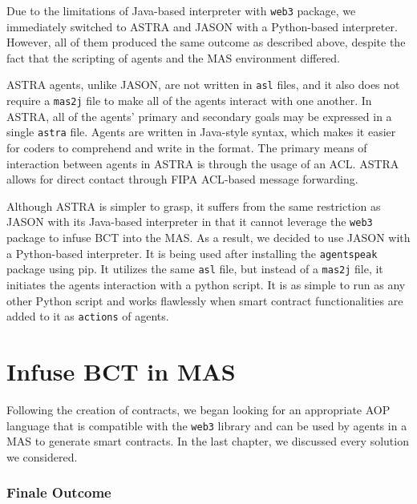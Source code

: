 \vspace{.5cm}

Due to the limitations of Java-based interpreter with \texttt{web3} package, we immediately switched to \ac{ASTRA} and JASON with a Python-based interpreter. However, all of them produced the same outcome as described above, despite the fact that the scripting of agents and the \ac{MAS} environment differed.

\vspace{.5cm}

\ac{ASTRA} agents, unlike JASON, are not written in \texttt{asl} files, and it also does not require a \texttt{mas2j} file to make all of the agents interact with one another. In \ac{ASTRA}, all of the agents' primary and secondary goals may be expressed in a single \texttt{astra} file. Agents are written in Java-style syntax, which makes it easier for coders to comprehend and write in the format. The primary means of interaction between agents in \ac{ASTRA} is through the usage of an \ac{ACL}. \ac{ASTRA} allows for direct contact through \ac{FIPA} \ac{ACL}-based message forwarding.

\vspace{.5cm}

Although \ac{ASTRA} is simpler to grasp, it suffers from the same restriction as JASON with its Java-based interpreter in that it cannot leverage the \texttt{web3} package to infuse \ac{BCT} into the \ac{MAS}. As a result, we decided to use JASON with a Python-based interpreter. It is being used after installing the \texttt{agentspeak} package using \ac{pip}. It utilizes the same \texttt{asl} file, but instead of a \texttt{mas2j} file, it initiates the agents interaction with a python script. It is as simple to run as any other Python script and works flawlessly when smart contract functionalities are added to it as \texttt{actions} of agents.

\section{Infuse \ac{BCT} in \ac{MAS} }

Following the creation of contracts, we began looking for an appropriate \ac{AOP} language that is compatible with the \texttt{web3} library and can be used by agents in a \ac{MAS} to generate smart contracts. In the last chapter, we discussed every solution we considered. 

\subsubsection{Finale Outcome}

